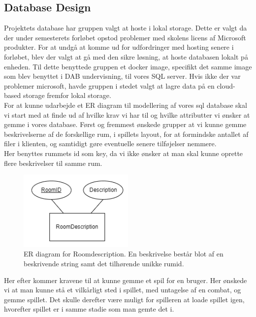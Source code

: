 \subsection{Database Design}

Projektets database har gruppen valgt at hoste i lokal storage. Dette er valgt da der under semesterets forløbet opstod problemer med skolens licens af Microsoft produkter. For at undgå at komme ud for udfordringer med hosting senere i forløbet, blev der valgt at gå med den sikre løsning, at hoste databasen lokalt på enheden. Til dette benyttede gruppen et docker image, specifikt det samme image som blev benyttet i DAB undervisning, til vores SQL server.
Hvis ikke der var problemer microsoft, havde gruppen i stedet valgt at lagre data på en cloud-based storage fremfor lokal storage.\\



For at kunne udarbejde et ER diagram til modellering af vores sql database skal vi start med at finde ud af hvilke krav vi har til og hvilke attributter vi ønsker at gemme i vores database.
Først og fremmest ønskede grupper at vi kunne gemme beskrivelserne af de forskellige rum, i spillets layout, for at formindske antallet af filer i klienten, og samtidigt gøre eventuelle senere tilføjelser nemmere.\\ 
Her benyttes rummets id som key, da vi ikke ønsker at man skal kunne oprette flere beskrivelser til samme rum.

\begin{figure}[H]
\centering
\includegraphics[width = 0.5\textwidth]{02-Body/Images/ER-RoomDescription.PNG}
\caption{ER diagram for Roomdescription. En beskrivelse består blot af en beskrivende string samt det tilhørende unikke rumid.}
\label{fig:ER-Roomdescription}
\end{figure}

Her efter kommer kravene til at kunne gemme et spil for en bruger. Her ønskede vi at man kunne stå et vilkårligt sted i spillet, med untagelse af en combat, og gemme spillet. Det skulle derefter være muligt for spilleren at loade spillet igen, hvorefter spillet er i samme stadie som man gemte det i.

